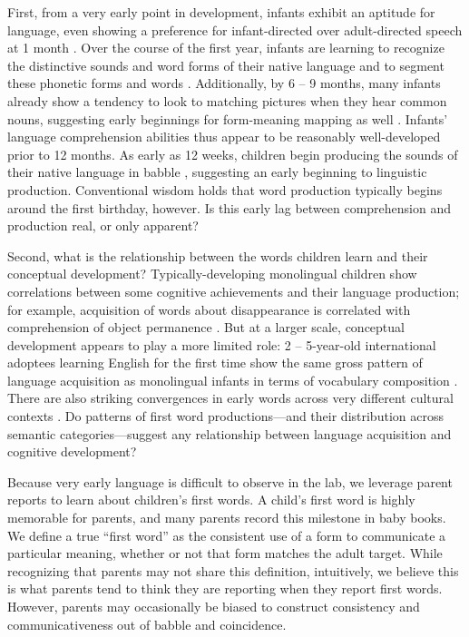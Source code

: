 \documentclass[10pt,letterpaper]{article}
\begin{document}
First, from a very early point in development, infants exhibit an aptitude for language, even showing a preference for infant-directed over adult-directed speech at 1 month \cite{cooper1990}. Over the course of the first year, infants are learning to recognize the distinctive sounds and word forms of their native language \cite{kuhl2004} and to segment these phonetic forms and words \cite{werker2005}. Additionally, by 6 -- 9 months, many infants already show a tendency to look to matching pictures when they hear common nouns, suggesting early beginnings for form-meaning mapping as well \cite{tincoff1999,tincoff2012,bergelson2012}. Infants' language comprehension abilities thus appear to be reasonably well-developed prior to 12 months. As early as 12 weeks, children begin producing the sounds of their native language in babble \cite{kuhl1996}, suggesting an early beginning to linguistic production. Conventional wisdom holds that word production typically begins around the first birthday, however. Is this early lag between comprehension and production real, or only apparent?

Second, what is the relationship between the words children learn and their conceptual development? Typically-developing monolingual children show correlations between some cognitive achievements and their language production; for example, acquisition of words about disappearance is correlated with comprehension of object permanence \cite{gopnik1986}. But at a larger scale, conceptual development appears to play a more limited role: 2 -- 5-year-old international adoptees learning English for the first time show the same gross pattern of language acquisition as monolingual infants in terms of vocabulary composition \cite{snedeker2007}. There are also striking convergences in early words across very different cultural contexts \cite{tardif2007}. Do patterns of first word productions---and their distribution across semantic categories---suggest any relationship between language acquisition and cognitive development? 

Because very early language is difficult to observe in the lab, we leverage parent reports to learn about children's first words. A child's first word is highly memorable for parents, and many parents record this milestone in baby books. We define a true ``first word'' as the consistent use of a form to communicate a particular meaning, whether or not that form matches the adult target. While recognizing that parents may not share this definition, intuitively, we believe this is what parents tend to think they are reporting when they report first words. However, parents may occasionally be biased to construct consistency and communicativeness out of babble and coincidence.
\end{document}
